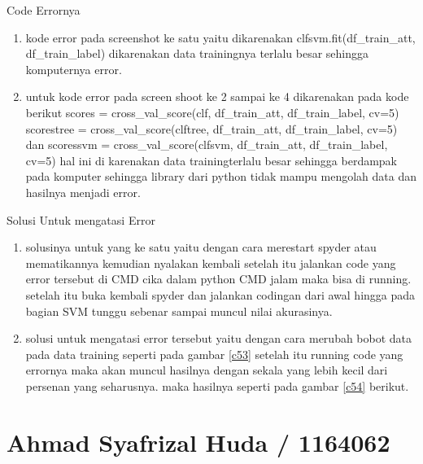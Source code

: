Code Errornya 
\begin{enumerate}
\item kode error pada screenshot ke satu yaitu dikarenakan clfsvm.fit(df\_train\_att, df\_train\_label) dikarenakan data trainingnya terlalu besar sehingga komputernya error.
\item untuk kode error pada screen shoot ke 2 sampai ke 4 dikarenakan pada kode berikut  scores = cross\_val\_score(clf, df\_train\_att, df\_train\_label, cv=5) scorestree = cross\_val\_score(clftree, df\_train\_att, df\_train\_label, cv=5) dan  
scoressvm = cross\_val\_score(clfsvm, df\_train\_att, df\_train\_label, cv=5) hal ini di karenakan data trainingterlalu besar sehingga berdampak pada komputer sehingga library dari python tidak mampu mengolah data dan hasilnya menjadi error. 
\end{enumerate}

Solusi Untuk mengatasi Error
\begin{enumerate}
\item solusinya untuk yang ke satu yaitu dengan cara merestart spyder atau mematikannya kemudian nyalakan kembali setelah itu jalankan code yang error tersebut di CMD cika dalam python CMD jalam maka bisa di running. setelah itu buka kembali spyder dan jalankan codingan dari awal hingga pada bagian SVM tunggu sebenar sampai muncul nilai akurasinya.
\item solusi untuk mengatasi error tersebut yaitu dengan cara merubah bobot data pada data training seperti pada gambar \ref{c53}
setelah itu running code yang errornya maka akan muncul hasilnya dengan sekala yang lebih kecil dari persenan yang seharusnya. maka hasilnya seperti pada gambar \ref{c54} berikut.
\end{enumerate}

\section{Ahmad Syafrizal Huda / 1164062}
